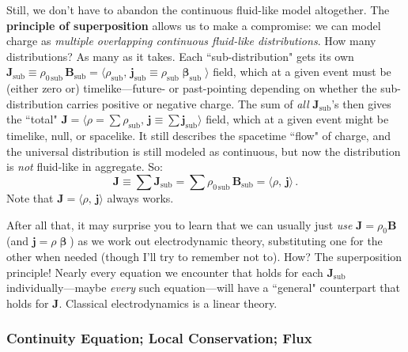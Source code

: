 \documentclass[12pt]{article}
\renewcommand{\vv}[1]{\mathbf{#1}}
\newcommand{\vvbeta}{\bm{\upbeta}}
\begin{document}
Still, we don't have to abandon the continuous fluid-like model altogether. The \textbf{principle of superposition} allows us to make a compromise: we can model charge as \emph{multiple overlapping continuous fluid-like distributions}. How many distributions? As many as it takes. Each ``sub-distribution" gets its own ${\vv J_{\mathrm{sub}} \equiv \rho_{0 \, \mathrm{sub}} \, \vv B_{\mathrm{sub}} = \langle \rho_{\mathrm{sub}}, \, \vv j_{\mathrm{sub}} \equiv \rho_{\mathrm{sub}} \vvbeta_{\mathrm{sub}} \rangle}$ field, which at a given event must be (either zero or) timelike---future- or past-pointing depending on whether the sub-distribution carries positive or negative charge. The sum of \emph{all} $\vv J_{\mathrm{sub}}$'s then gives the ``total" ${\vv J = \langle \rho = \sum \rho_{\mathrm{sub}}, \, \vv j \equiv \sum \vv j_{\mathrm{sub}} \rangle }$ field, which at a given event might be timelike, null, or spacelike. It still describes the spacetime ``flow" of charge, and the universal distribution is still modeled as continuous, but now the distribution is \emph{not} fluid-like in aggregate. So:
\begin{equation}\label{eq:fc}
\boxed{ \vv J \equiv \sum \vv J_{\mathrm{sub}} = \sum \rho_{0 \, \mathrm{sub}} \, \vv B_{\mathrm{sub}} = \langle \rho, \, \vv j \rangle } \, .
\end{equation}
Note that $\vv J = \langle \rho, \, \vv j \rangle$ always works.

After all that, it may surprise you to learn that we can usually just \emph{use} $\vv J = \rho_0 \vv B$ (and $\vv j = \rho \vvbeta$) as we work out electrodynamic theory, substituting one for the other when needed (though I'll try to remember not to). How? The superposition principle! Nearly every equation we encounter that holds for each $\vv J_{\mathrm{sub}}$ individually---maybe \emph{every} such equation---will have a ``general" counterpart that holds for $\vv J$. Classical electrodynamics is a linear theory.

\subsubsection{Continuity Equation; Local Conservation; Flux}\label{sssec:cont}
\end{document}
